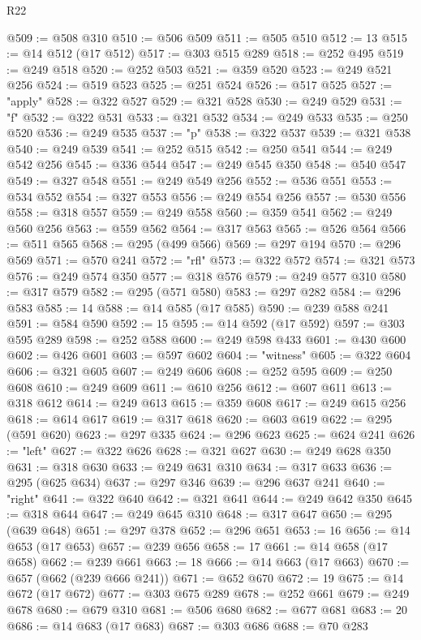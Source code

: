 \begin{lexlean}{R22}
\begin{coremodule}
@509 := @508 @310
@510 := @506 @509
@511 := @505 @510
@512 := 13
@515 := @14 @512 (@17 @512)
@517 := @303 @515 @289
@518 := @252 @495
@519 := @249 @518
@520 := @252 @503
@521 := @359 @520
@523 := @249 @521 @256
@524 := @519 @523
@525 := @251 @524
@526 := @517 @525
@527 := "apply"
@528 := @322 @527
@529 := @321 @528
@530 := @249 @529
@531 := "f"
@532 := @322 @531
@533 := @321 @532
@534 := @249 @533
@535 := @250 @520
@536 := @249 @535
@537 := "p"
@538 := @322 @537
@539 := @321 @538
@540 := @249 @539
@541 := @252 @515
@542 := @250 @541
@544 := @249 @542 @256
@545 := @336 @544
@547 := @249 @545 @350
@548 := @540 @547
@549 := @327 @548
@551 := @249 @549 @256
@552 := @536 @551
@553 := @534 @552
@554 := @327 @553
@556 := @249 @554 @256
@557 := @530 @556
@558 := @318 @557
@559 := @249 @558
@560 := @359 @541
@562 := @249 @560 @256
@563 := @559 @562
@564 := @317 @563
@565 := @526 @564
@566 := @511 @565
@568 := @295 (@499 @566)
@569 := @297 @194
@570 := @296 @569
@571 := @570 @241
@572 := "rfl"
@573 := @322 @572
@574 := @321 @573
@576 := @249 @574 @350
@577 := @318 @576
@579 := @249 @577 @310
@580 := @317 @579
@582 := @295 (@571 @580)
@583 := @297 @282
@584 := @296 @583
@585 := 14
@588 := @14 @585 (@17 @585)
@590 := @239 @588 @241
@591 := @584 @590
@592 := 15
@595 := @14 @592 (@17 @592)
@597 := @303 @595 @289
@598 := @252 @588
@600 := @249 @598 @433
@601 := @430 @600
@602 := @426 @601
@603 := @597 @602
@604 := "witness"
@605 := @322 @604
@606 := @321 @605
@607 := @249 @606
@608 := @252 @595
@609 := @250 @608
@610 := @249 @609
@611 := @610 @256
@612 := @607 @611
@613 := @318 @612
@614 := @249 @613
@615 := @359 @608
@617 := @249 @615 @256
@618 := @614 @617
@619 := @317 @618
@620 := @603 @619
@622 := @295 (@591 @620)
@623 := @297 @335
@624 := @296 @623
@625 := @624 @241
@626 := "left"
@627 := @322 @626
@628 := @321 @627
@630 := @249 @628 @350
@631 := @318 @630
@633 := @249 @631 @310
@634 := @317 @633
@636 := @295 (@625 @634)
@637 := @297 @346
@639 := @296 @637 @241
@640 := "right"
@641 := @322 @640
@642 := @321 @641
@644 := @249 @642 @350
@645 := @318 @644
@647 := @249 @645 @310
@648 := @317 @647
@650 := @295 (@639 @648)
@651 := @297 @378
@652 := @296 @651
@653 := 16
@656 := @14 @653 (@17 @653)
@657 := @239 @656
@658 := 17
@661 := @14 @658 (@17 @658)
@662 := @239 @661
@663 := 18
@666 := @14 @663 (@17 @663)
@670 := @657 (@662 (@239 @666 @241))
@671 := @652 @670
@672 := 19
@675 := @14 @672 (@17 @672)
@677 := @303 @675 @289
@678 := @252 @661
@679 := @249 @678
@680 := @679 @310
@681 := @506 @680
@682 := @677 @681
@683 := 20
@686 := @14 @683 (@17 @683)
@687 := @303 @686
@688 := @70 @283

\end{coremodule}
\end{lexlean}
